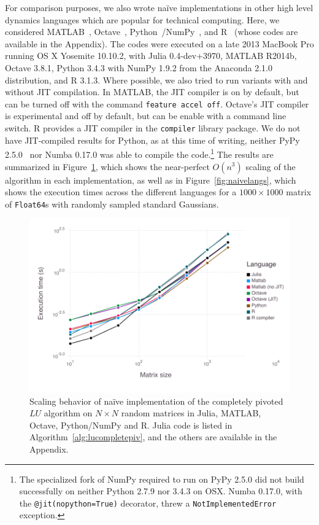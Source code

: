 For comparison purposes, we also wrote na\"ive implementations in other high
level dynamics languages which are popular for technical computing. Here, we
considered MATLAB~\cite{matlab}, Octave~\cite{octave},
Python~\cite{python}/NumPy~\cite{numpy}, and R~\cite{rlang} (whose codes are
available in the Appendix). The codes were executed on a late 2013 MacBook Pro
running OS X
Yosemite 10.10.2, with Julia 0.4-dev+3970, MATLAB R2014b, Octave 3.8.1, Python
3.4.3 with NumPy 1.9.2 from the Anaconda 2.1.0 distribution, and R 3.1.3. Where
possible, we also tried to run variants with and without JIT compilation. In
MATLAB, the JIT compiler is on by default, but can be turned off with the
command \lstinline|feature accel off|. Octave's JIT compiler is experimental
and off by default, but can be enable with a command line switch. R provides a
JIT compiler in the \lstinline|compiler| library package. We do not have
JIT-compiled results for Python, as at this time of writing, neither PyPy
2.5.0~\cite{Bolz2009} nor Numba 0.17.0 was able to compile the code.\footnote{
The specialized fork of NumPy required to run on PyPy 2.5.0 did not build
successfully on neither Python 2.7.9 nor 3.4.3 on OSX. Numba 0.17.0, with the
\lstinline|@jit(nopython=True)| decorator, threw a
\lstinline|NotImplementedError| exception.}
The results are summarized in Figure~\ref{fig:scaling}, which shows the
near-perfect $O(n^3)$ scaling of the algorithm in each implementation, as well
as in Figure~\ref{fig:naivelangs}, which shows the execution times across the
different languages for a $1000 \times 1000$ matrix of \lstinline|Float64|s
with randomly sampled standard Gaussians.



\begin{figure}
	\includegraphics[width=\textwidth]{data/fig-scaling}
	\caption{Scaling behavior of na\"ive implementation of the completely
	pivoted $LU$ algorithm on $N\times N$ random matrices in Julia, MATLAB,
	Octave, Python/NumPy and R. Julia code is listed in
	Algorithm~\ref{alg:lucompletepiv}, and the others are available in the
	Appendix.} \label{fig:scaling}
\end{figure}

